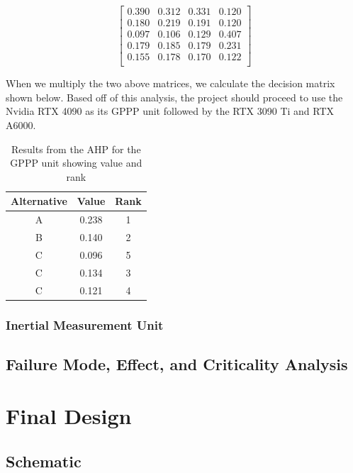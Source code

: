 \[ 
\left[ {\begin{array}{cccccc}
0.390 & 0.312 & 0.331 & 0.120 \\
0.180 & 0.219 & 0.191 & 0.120 \\
0.097 & 0.106 & 0.129 & 0.407 \\
0.179 & 0.185 & 0.179 & 0.231 \\
0.155 & 0.178 & 0.170 & 0.122 \\
\end{array} } \right]
\]

When we multiply the two above matrices, we calculate the decision matrix shown below. Based off of this analysis, the project should proceed to use the Nvidia RTX 4090 as its GPPP unit followed by the RTX 3090 Ti and RTX A6000.

\begin{table}[]
    \centering
    \begin{tabular}{|c|c|c|}
        \hline
        \textbf{Alternative} & \textbf{Value} & \textbf{Rank} \\
        \hline
        A & 0.238 & 1 \\ \hline
        B & 0.140 & 2 \\ \hline
        C & 0.096 & 5 \\ \hline
        C & 0.134 & 3 \\ \hline
        C & 0.121 & 4 \\ \hline
    \end{tabular}
    \caption{Results from the AHP for the GPPP unit showing value and rank}
    \label{tab:gppp_ahp_results}
\end{table}        
\subsubsection*{Inertial Measurement Unit} \label{sssec:ahp_imu}

\subsection{Failure Mode, Effect, and Criticality Analysis} \label{ssec:fmeca}

\section{Final Design} \label{sec:final_design}

\subsection{Schematic} \label{ssec:schematic}

